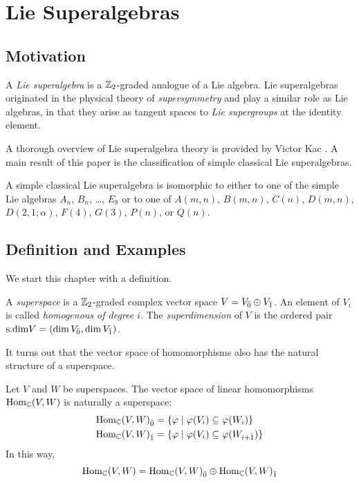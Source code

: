 \chapter{Lie Superalgebras}
\label{chap:lsa}

\section{Motivation}
\label{sec:motivate-lsa}

A \emph{Lie superalgebra} is a $\mathbb{Z}_2$-graded analogue of a Lie algebra. Lie superalgebras originated in the physical theory of \emph{supersymmetry} and play a similar role as Lie algebras, in that they arise as tangent spaces to \emph{Lie supergroups} at the identity element.

A thorough overview of Lie superalgebra theory is provided by Victor Kac \cite{Kac}. A main result of this paper is the classification of simple classical Lie superalgebras.

\begin{theorem}
  A simple classical Lie superalgebra is isomorphic to either to one of the simple Lie algebras $A_n$, $B_n$, \ldots, $E_8$ or to one of $A(m,n)$, $B(m,n)$, $C(n)$, $D(m,n)$, $D(2,1;\alpha)$, $F(4)$, $G(3)$, $P(n)$, or $Q(n)$.
\end{theorem}

\section{Definition and Examples}

We start this chapter with a definition.

\begin{definition}
  A \emph{superspace} is a $\mathbb{Z}_2$-graded complex vector space $V = {V}_{\bar{0}} \oplus {V}_{\bar{1}}$. An element of $V_i$ is called \emph{homogenous of degree $i$}. The \emph{superdimension} of $V$ is the ordered pair $\text{s.dim} V = (\dim {V}_{\bar{0}}, \dim {V}_{\bar{1}})$.
\end{definition}

It turns out that the vector space of homomorphisms also has the natural structure of a superspace.

\begin{example} \label{ex:hom}
  Let $V$ and $W$ be superspaces. The vector space of linear homomorphisms $\operatorname{Hom}_{\mathbb{C}}(V,W)$ is naturally a superspace:
  \begin{align*}
    {\operatorname{Hom}_{\mathbb{C}}(V,W)}_{\bar{0}} &= \{ \varphi \mid \varphi(V_i) \subseteq \varphi(W_i)\} \\
    {\operatorname{Hom}_{\mathbb{C}}(V,W)}_{\bar{1}} &= \{ \varphi \mid \varphi(V_i) \subseteq \varphi(W_{i + \bar 1})\}
  \end{align*}
  In this way,
  \[
    \operatorname{Hom}_{\mathbb{C}}(V,W) = {\operatorname{Hom}_{\mathbb{C}}(V,W)}_{\bar{0}} \oplus {\operatorname{Hom}_{\mathbb{C}}(V,W)}_{\bar{1}}
  \]
  
\end{example}

